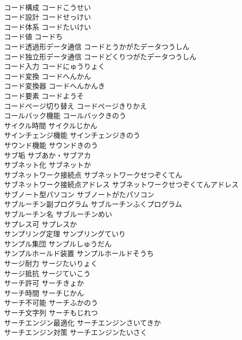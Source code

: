 \documentclass[8pt]{extreport}
\begin{document}
\begin{CJK}{UTF8}{min}
\\	コード構成	コードこうせい	
\\	コード設計	コードせっけい	
\\	コード体系	コードたいけい	
\\	コード値	コードち	
\\	コード透過形データ通信	コードとうかがたデータつうしん	
\\	コード独立形データ通信	コードどくりつがたデータつうしん	
\\	コード入力	コードにゅうりょく	
\\	コード変換	コードへんかん	
\\	コード変換器	コードへんかんき	
\\	コード要素	コードようそ	
\\	コードページ切り替え	コードページきりかえ	
\\	コールバック機能	コールバックきのう	
\\	サイクル時間	サイクルじかん	
\\	サインチェンジ機能	サインチェンジきのう	
\\	サウンド機能	サウンドきのう	
\\	サブ垢	サブあか・サブアカ	
\\	サブネット化	サブネットか	
\\	サブネットワーク接続点	サブネットワークせつぞくてん	
\\	サブネットワーク接続点アドレス	サブネットワークせつぞくてんアドレス	
\\	サブノート型パソコン	サブノートがたパソコン	
\\	サブルーチン副プログラム	サブルーチンふくプログラム	
\\	サブルーチン名	サブルーチンめい	
\\	サプレス可	サプレスか	
\\	サンプリング定理	サンプリングていり	
\\	サンプル集団	サンプルしゅうだん	
\\	サンプルホールド装置	サンプルホールドそうち	
\\	サージ耐力	サージたいりょく	
\\	サージ抵抗	サージていこう	
\\	サーチ許可	サーチきょか	
\\	サーチ時間	サーチじかん	
\\	サーチ不可能	サーチふかのう	
\\	サーチ文字列	サーチもじれつ	
\\	サーチエンジン最適化	サーチエンジンさいてきか	
\\	サーチエンジン対策	サーチエンジンたいさく	

\end{CJK}
\end{document}
